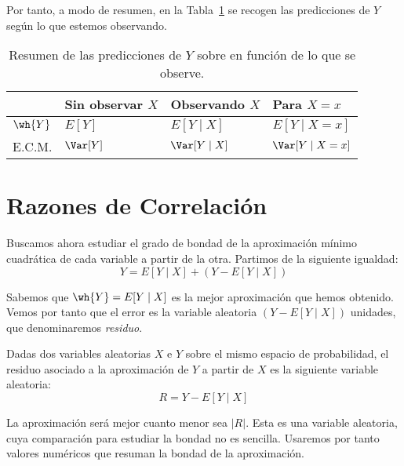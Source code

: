 Por tanto, a modo de resumen, en la Tabla~\ref{tab:resumen_regresion} se recogen las predicciones de $Y$ según lo que estemos observando.
\begin{table}[H]
    \centering
    \begin{tabular}{>{\centering\arraybackslash}m{3cm} |>{\centering\arraybackslash}m{3cm} >{\centering\arraybackslash}m{3cm} >{\centering\arraybackslash}m{3cm}}
        \toprule
        & Sin observar $X$ & Observando $X$ & Para $X=x$\\
        \midrule
        $\wh{Y}$ & $E[Y]$ & $E[Y\mid X]$ & $E[Y\mid X=x]$\\
        E.C.M. & $\Var[Y]$ & $\Var[Y\mid X]$ & $\Var[Y\mid X=x]$\\
        \bottomrule
    \end{tabular}
    \caption{Resumen de las predicciones de $Y$ sobre en función de lo que se observe.}
    \label{tab:resumen_regresion}
\end{table}


\section{Razones de Correlación}

Buscamos ahora estudiar el grado de bondad de la aproximación mínimo cuadrática de cada variable a partir de la otra. Partimos de la siguiente igualdad:
\begin{equation*}
    Y = E[Y\mid X] + (Y - E[Y\mid X])
\end{equation*}

Sabemos que $\wh{Y}=E[Y\mid X]$ es la mejor aproximación que hemos obtenido. Vemos por tanto que el error es la variable aleatoria $(Y - E[Y\mid X])$ unidades, que denominaremos \emph{residuo}.
\begin{definicion}[Residuo]
    Dadas dos variables aleatorias $X$ e $Y$ sobre el mismo espacio de probabilidad, el residuo asociado a la aproximación de $Y$ a partir de $X$ es la siguiente variable aleatoria:
    \begin{equation*}
        R = Y - E[Y\mid X]
    \end{equation*}
\end{definicion}

La aproximación será mejor cuanto menor sea $|R|$. Esta es una variable aleatoria, cuya comparación para estudiar la bondad no es sencilla. Usaremos por tanto valores numéricos que resuman la bondad de la aproximación. 

